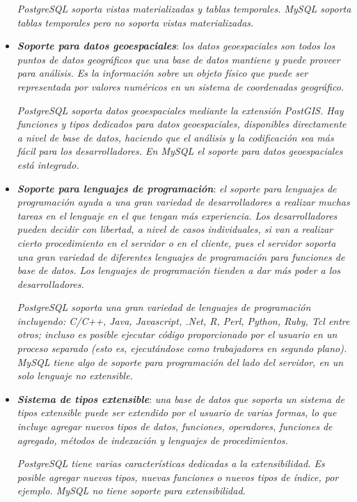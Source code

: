 \documentclass[11pt,oneside]{book}
\begin{document}
\begin{itemize}
\newpage
\textit{PostgreSQL soporta vistas materializadas y tablas temporales. MySQL soporta tablas temporales pero no soporta vistas materializadas.}

\item \textit{\textbf{Soporte para datos geoespaciales}}: \textit{los datos geoespaciales son todos los puntos de datos geográficos que una base de datos mantiene y puede proveer para análisis. Es la información sobre un objeto físico que puede ser representada por valores numéricos en un sistema de coordenadas geográfico.}

\textit{PostgreSQL soporta datos geoespaciales mediante la extensión PostGIS. Hay funciones y tipos dedicados para datos geoespaciales, disponibles directamente a nivel de base de datos, haciendo que el análisis y la codificación sea más fácil para los desarrolladores. En MySQL el soporte para datos geoespaciales está integrado.}

\item \textit{\textbf{Soporte para lenguajes de programación}}: \textit{el soporte para lenguajes de programación ayuda a una gran variedad de desarrolladores a realizar muchas tareas en el lenguaje en el que tengan más experiencia. Los desarrolladores pueden decidir con libertad, a nivel de casos individuales, si van a realizar cierto procedimiento en el servidor o en el cliente, pues el servidor soporta una gran variedad de diferentes lenguajes de programación para funciones de base de datos. Los lenguajes de programación tienden a dar más poder a los desarrolladores.}

\textit{PostgreSQL soporta una gran variedad de lenguajes de programación incluyendo: C/C++, Java, Javascript, .Net, R, Perl, Python, Ruby, Tcl entre otros; incluso es posible ejecutar código proporcionado por el usuario en un proceso separado (esto es, ejecutándose como trabajadores en segundo plano). MySQL tiene algo de soporte para programación del lado del servidor, en un solo lenguaje no extensible.}

\item \textit{\textbf{Sistema de tipos extensible}}: \textit{una base de datos que soporta un sistema de tipos extensible puede ser extendido por el usuario de varias formas, lo que incluye agregar nuevos tipos de datos, funciones, operadores, funciones de agregado, métodos de indexación y lenguajes de procedimientos.}

\textit{PostgreSQL tiene varias características dedicadas a la extensibilidad. Es posible agregar nuevos tipos, nuevas funciones o nuevos tipos de índice, por ejemplo. MySQL no tiene soporte para extensibilidad.}
\end{itemize}
\end{document}
